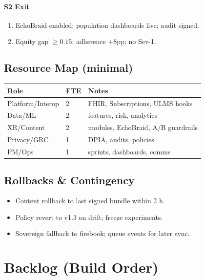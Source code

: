 \documentclass[11pt]{article}
\theoremstyle{plain}
\begin{document}
\paragraph{S2 Exit}
\begin{enumerate}
  \item EchoBraid enabled; population dashboards live; audit signed.
  \item Equity gap $\ge 0.15$; adherence $+8$pp; no Sev-1.
\end{enumerate}

\subsection{Resource Map (minimal)}
\begin{center}
\begin{tabular}{l l l}
\hline
Role & FTE & Notes \\
\hline
Platform/Interop & 2 & FHIR, Subscriptions, ULMS hooks \\
Data/ML & 2 & features, risk, analytics \\
XR/Content & 2 & modules, EchoBraid, A/B guardrails \\
Privacy/GRC & 1 & DPIA, audits, policies \\
PM/Ops & 1 & sprints, dashboards, comms \\
\hline
\end{tabular}
\end{center}

\subsection{Rollbacks \& Contingency}
\begin{itemize}
  \item Content rollback to last signed bundle within 2 h.
  \item Policy revert to v1.3 on drift; freeze experiments.
  \item Sovereign fallback to firebook; queue events for later sync.
\end{itemize}

\section{Backlog (Build Order)}
\end{document}
